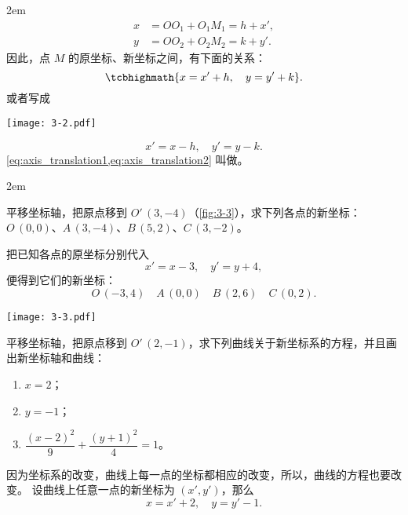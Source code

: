 \noindent
\begin{minipage}{0.62\linewidth}\parindent2em
\begin{align*}
  x&=OO_1+O_1M_1 =h+x', \\
  y&=OO_2+O_2M_2 =k+y'.
\end{align*}
因此，点 $M$ 的原坐标、新坐标之间，有下面的关系：
\begin{equation}
  \label{eq:axis_translation1}
  \tcbhighmath{x=x'+h,\quad y=y'+k}.
\end{equation}
或者写成
\end{minipage}\hfill
\begin{minipage}{0.33\linewidth}\centering
  \begin{figurehere}
    \texttt{[image: 3-2.pdf]}
    \caption{}\label{fig:3-2}
  \end{figurehere}
\end{minipage}
\begin{equation}
  \label{eq:axis_translation2}
  x'=x-h,\quad y'=y-k.
\end{equation}
\cref{eq:axis_translation1,eq:axis_translation2} 叫做。

\bigskip\noindent
\begin{minipage}{0.62\linewidth}\parindent2em
\begin{example}
  平移坐标轴，把原点移到 $O'\,(3,-4)$（\cref{fig:3-3}），求下列各点的新坐标：$O\,(0,0)$、$A\,(3,-4)$、$B\,(5,2)$、$C\,(3,-2)$。
\end{example}
\begin{solution}
  把已知各点的原坐标分别代入
  \[x'=x-3,\quad y'=y+4,\]
  便得到它们的新坐标：
  \[O\,(-3,4)\quad A\,(0,0)\quad B\,(2,6)\quad C\,(0,2).\]
\end{solution}
\end{minipage}\hfill
\begin{minipage}{0.33\linewidth}
  \begin{figurehere}
    \texttt{[image: 3-3.pdf]}
    \caption{}\label{fig:3-3}
  \end{figurehere}
\end{minipage}

\medskip
\begin{example}
  平移坐标轴，把原点移到 $O'\,(2,-1)$，求下列曲线关于新坐标系的方程，并且画出新坐标轴和曲线：
  \begin{enumerate}
    \item $x=2$；
    \item $y=-1$；
    \item $\dfrac{(x-2)^2}{9}+\dfrac{(y+1)^2}{4}=1$。
  \end{enumerate}
\end{example}
\begin{solution}
  因为坐标系的改变，曲线上每一点的坐标都相应的改变，所以，曲线的方程也要改变。
  设曲线上任意一点的新坐标为 $(x',y')$，那么
  \[x=x'+2,\quad y=y'-1.\]
  
\end{solution}


